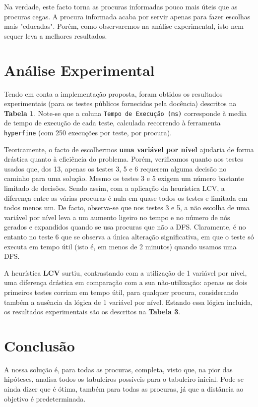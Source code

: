 \documentclass[12pt,a4paper]{article}
\begin{document}
Na verdade, este facto torna as procuras informadas pouco mais úteis que as procuras cegas.
A procura informada acaba por servir apenas para fazer escolhas mais "educadas".
Porém, como observaremos na análise experimental, isto nem sequer leva a melhores resultados.

\section*{Análise Experimental}

Tendo em conta a implementação proposta, foram obtidos os resultados experimentais (para os testes públicos fornecidos pela docência) descritos na \textbf{Tabela 1}.
Note-se que a coluna \texttt{Tempo de Execução (ms)} corresponde à media de tempo de execução de cada teste, calculada recorrendo à ferramenta \texttt{hyperfine} (com 250 execuções por teste, por procura).

Teoricamente, o facto de escolhermos \textbf{uma variável por nível} ajudaria de forma drástica quanto à eficiência do problema.
Porém, verificamos quanto aos testes usados que, dos 13, apenas os testes 3, 5 e 6 requerem alguma decisão no caminho para uma solução.
Mesmo os testes 3 e 5 exigem um número bastante limitado de decisões.
Sendo assim, com a aplicação da heurística LCV, a diferença entre as várias procuras é nula em quase todos os testes e limitada em todos menos um.
De facto, observa-se que nos testes 3 e 5, a não escolha de uma variável por nível leva a um aumento ligeiro no tempo e no número de nós gerados e expandidos quando se usa procuras que não a DFS.
Claramente, é no entanto no teste 6 que se observa a única alteração significativa, em que o teste só executa em tempo útil (isto é, em menos de 2 minutos) quando usamos uma DFS.

A heurística \textbf{LCV} surtiu, contrastando com a utilização de 1 variável por nível, uma diferença drástica em comparação com a sua não-utilização: apenas os dois primeiros testes corriam em tempo útil, para qualquer procura, considerando também a ausência da lógica de 1 variável por nível.
Estando essa lógica incluída, os resultados experimentais são os descritos na \textbf{Tabela 3}.

\section*{Conclusão}

A nossa solução é, para todas as procuras, completa, visto que, na pior das hipóteses, analisa todos os tabuleiros possíveis para o tabuleiro inicial.
Pode-se ainda dizer que é ótima, também para todas as procuras, já que a distância ao objetivo é predeterminada.
\end{document}
